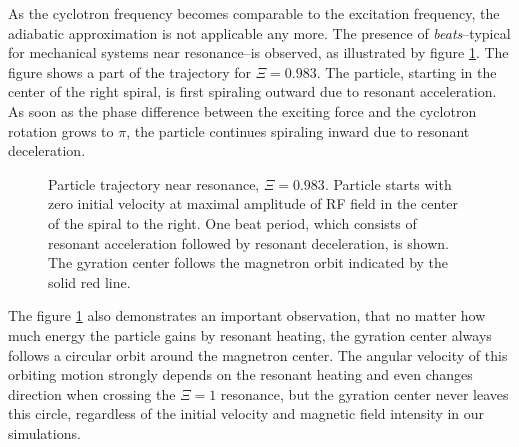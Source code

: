 As the cyclotron frequency becomes comparable to the excitation
frequency, the adiabatic approximation is not applicable any more.
The presence of {\em beats}--typical for mechanical systems near
resonance--is observed, as illustrated by figure \ref{fig:esmpt:beat}.
The figure shows a part of the trajectory for $\Xi = 0.983$.
The particle, starting in the center of the right spiral, is
first spiraling outward due to resonant acceleration. As soon
as the phase difference between the exciting force and the
cyclotron rotation grows to $\pi$, the particle continues
spiraling inward due to resonant deceleration.
\begin{figure}
\caption{Particle trajectory near resonance, $\Xi=0.983$.
Particle starts with zero initial velocity at maximal amplitude of
\ac{RF} field in the center of the spiral to the right.
One beat period, which consists of resonant acceleration followed
by resonant deceleration, is shown.
The gyration center follows the magnetron orbit indicated by
the solid red line.
}
\label{fig:esmpt:beat}
\end{figure}

The figure \ref{fig:esmpt:beat} also demonstrates an important
observation, that no matter how much energy the particle
gains by resonant heating, the gyration center always follows
a circular orbit around the magnetron center. The angular
velocity of this
orbiting motion strongly depends on the resonant heating
and even changes direction when crossing the $\Xi=1$ resonance,
but the gyration center never leaves this circle, regardless of
the initial velocity and magnetic field intensity in our simulations.


